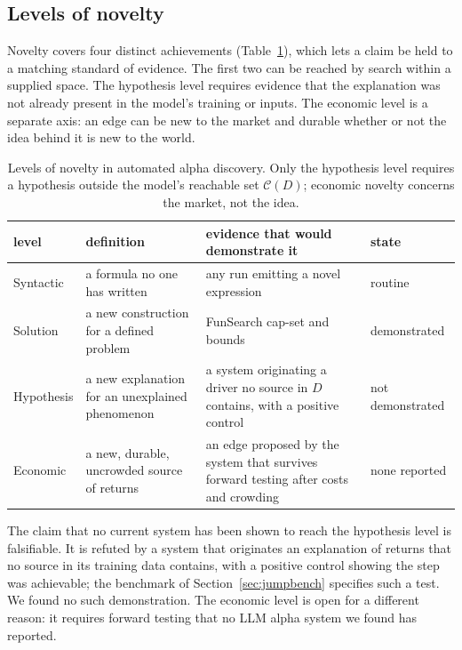 \documentclass[11pt]{article}
\begin{document}
\subsection{Levels of novelty}
\label{sec:novelty}

Novelty covers four distinct achievements (Table~\ref{tab:novelty}), which lets a claim be held to a
matching standard of evidence. The first two can be reached by search within a supplied space. The
hypothesis level requires evidence that the explanation was not already present in the model's
training or inputs. The economic level is a separate axis: an edge can be new to the market and durable
whether or not the idea behind it is new to the world.

\begin{table}[htbp]
\centering
\caption{Levels of novelty in automated alpha discovery. Only the hypothesis level requires a
hypothesis outside the model's reachable set $\mathcal{C}(D)$; economic novelty concerns the market, not
the idea.}
\label{tab:novelty}
\small
\begin{tabular}{@{}p{2.3cm} p{3.9cm} p{4.1cm} p{2.4cm}@{}}
\toprule
level & definition & evidence that would demonstrate it & state \\
\midrule
Syntactic & a formula no one has written & any run emitting a novel expression & routine \\[2pt]
Solution & a new construction for a defined problem & FunSearch cap-set and bounds~\cite{funsearch} & demonstrated \\[2pt]
Hypothesis & a new explanation for an unexplained phenomenon & a system originating a driver no source in $D$ contains, with a positive control & not demonstrated \\[2pt]
Economic & a new, durable, uncrowded source of returns & an edge proposed by the system that survives forward testing after costs and crowding & none reported \\
\bottomrule
\end{tabular}
\end{table}

The claim that no current system has been shown to reach the hypothesis level is falsifiable. It is
refuted by a system that originates an explanation of returns that no source in its training data
contains, with a positive control showing the step was achievable; the benchmark of
Section~\ref{sec:jumpbench} specifies such a test. We found no such demonstration. The economic level is
open for a different reason: it requires forward testing that no LLM alpha system we found has
reported.
\end{document}
